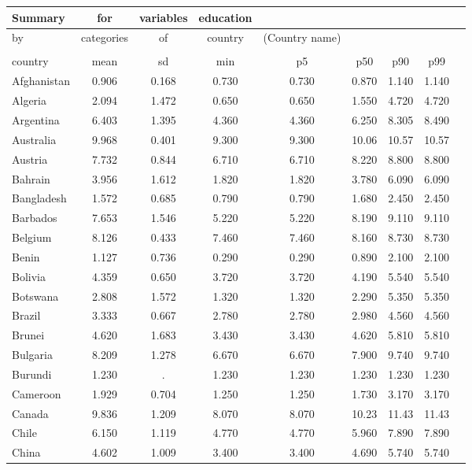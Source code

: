 \documentclass[]{article}
\begin{document}
\begin{tabular}{lcccccccc} \hline
Summary & for & variables & education &  &  &  &  &  \\ \hline
by & categories & of & country & (Country name) &  &  &  &  \\
 &  &  &  &  &  &  &  &  \\
country & mean & sd & min & p5 & p50 & p90 & p99 &  \\
Afghanistan & 0.906 & 0.168 & 0.730 & 0.730 & 0.870 & 1.140 & 1.140 &  \\
Algeria & 2.094 & 1.472 & 0.650 & 0.650 & 1.550 & 4.720 & 4.720 &  \\
Argentina & 6.403 & 1.395 & 4.360 & 4.360 & 6.250 & 8.305 & 8.490 &  \\
Australia & 9.968 & 0.401 & 9.300 & 9.300 & 10.06 & 10.57 & 10.57 &  \\
Austria & 7.732 & 0.844 & 6.710 & 6.710 & 8.220 & 8.800 & 8.800 &  \\
Bahrain & 3.956 & 1.612 & 1.820 & 1.820 & 3.780 & 6.090 & 6.090 &  \\
Bangladesh & 1.572 & 0.685 & 0.790 & 0.790 & 1.680 & 2.450 & 2.450 &  \\
Barbados & 7.653 & 1.546 & 5.220 & 5.220 & 8.190 & 9.110 & 9.110 &  \\
Belgium & 8.126 & 0.433 & 7.460 & 7.460 & 8.160 & 8.730 & 8.730 &  \\
Benin & 1.127 & 0.736 & 0.290 & 0.290 & 0.890 & 2.100 & 2.100 &  \\
Bolivia & 4.359 & 0.650 & 3.720 & 3.720 & 4.190 & 5.540 & 5.540 &  \\
Botswana & 2.808 & 1.572 & 1.320 & 1.320 & 2.290 & 5.350 & 5.350 &  \\
Brazil & 3.333 & 0.667 & 2.780 & 2.780 & 2.980 & 4.560 & 4.560 &  \\
Brunei & 4.620 & 1.683 & 3.430 & 3.430 & 4.620 & 5.810 & 5.810 &  \\
Bulgaria & 8.209 & 1.278 & 6.670 & 6.670 & 7.900 & 9.740 & 9.740 &  \\
Burundi & 1.230 & . & 1.230 & 1.230 & 1.230 & 1.230 & 1.230 &  \\
Cameroon & 1.929 & 0.704 & 1.250 & 1.250 & 1.730 & 3.170 & 3.170 &  \\
Canada & 9.836 & 1.209 & 8.070 & 8.070 & 10.23 & 11.43 & 11.43 &  \\
Chile & 6.150 & 1.119 & 4.770 & 4.770 & 5.960 & 7.890 & 7.890 &  \\
China & 4.602 & 1.009 & 3.400 & 3.400 & 4.690 & 5.740 & 5.740 &  \\

\end{tabular}
\end{document}
